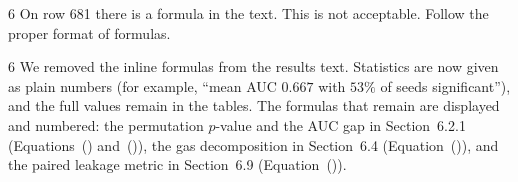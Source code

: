 \begin{reviewcomment}{6}
	On row 681 there is a formula in the text. This is not acceptable. Follow the proper format of formulas.
\end{reviewcomment}

\begin{reviewresponse}{6}
	We removed the inline formulas from the results text.
	Statistics are now given as plain numbers (for example, ``mean AUC $0.667$ with $53\%$ of seeds significant''), and the full values remain in the tables.
	The formulas that remain are displayed and numbered: the permutation $p$-value and the AUC gap in Section~6.2.1 (Equations~() and~()), the gas decomposition in Section~6.4 (Equation~()), and the paired leakage metric in Section~6.9 (Equation~()).

\end{reviewresponse}
